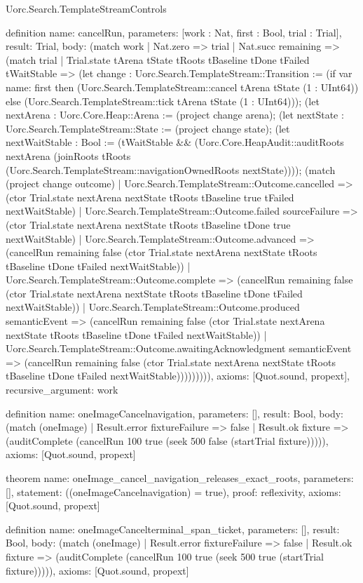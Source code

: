 \begin{lexlean}{Uorc.Search.TemplateStreamControls}
\begin{semanticmodule}
definition{
  name: cancelRun,
  parameters: [work : Nat, first : Bool, trial : Trial],
  result: Trial,
  body: (match work
    | Nat.zero => trial
    | Nat.succ remaining => (match trial
      | Trial.state tArena tState tRoots tBaseline tDone tFailed tWaitStable => (let change : Uorc.Search.TemplateStream::Transition := (if var{
        name: first
      } then (Uorc.Search.TemplateStream::cancel tArena tState (1 : UInt64)) else (Uorc.Search.TemplateStream::tick tArena tState (1 : UInt64))); (let nextArena : Uorc.Core.Heap::Arena := (project change arena); (let nextState : Uorc.Search.TemplateStream::State := (project change state); (let nextWaitStable : Bool := (tWaitStable && (Uorc.Core.HeapAudit::auditRoots nextArena (joinRoots tRoots (Uorc.Search.TemplateStream::navigationOwnedRoots nextState)))); (match (project change outcome)
        | Uorc.Search.TemplateStream::Outcome.cancelled => (ctor Trial.state nextArena nextState tRoots tBaseline true tFailed nextWaitStable)
        | Uorc.Search.TemplateStream::Outcome.failed sourceFailure => (ctor Trial.state nextArena nextState tRoots tBaseline tDone true nextWaitStable)
        | Uorc.Search.TemplateStream::Outcome.advanced => (cancelRun remaining false (ctor Trial.state nextArena nextState tRoots tBaseline tDone tFailed nextWaitStable))
        | Uorc.Search.TemplateStream::Outcome.complete => (cancelRun remaining false (ctor Trial.state nextArena nextState tRoots tBaseline tDone tFailed nextWaitStable))
        | Uorc.Search.TemplateStream::Outcome.produced semanticEvent => (cancelRun remaining false (ctor Trial.state nextArena nextState tRoots tBaseline tDone tFailed nextWaitStable))
        | Uorc.Search.TemplateStream::Outcome.awaitingAcknowledgment semanticEvent => (cancelRun remaining false (ctor Trial.state nextArena nextState tRoots tBaseline tDone tFailed nextWaitStable))))))))),
  axioms: [Quot.sound, propext],
  recursive_argument: work
}

definition{
  name: oneImageCancelnavigation,
  parameters: [],
  result: Bool,
  body: (match (oneImage)
    | Result.error fixtureFailure => false
    | Result.ok fixture => (auditComplete (cancelRun 100 true (seek 500 false (startTrial fixture))))),
  axioms: [Quot.sound, propext]
}

theorem{
  name: oneImage_cancel_navigation_releases_exact_roots,
  parameters: [],
  statement: ((oneImageCancelnavigation) = true),
  proof: reflexivity{},
  axioms: [Quot.sound, propext]
}

definition{
  name: oneImageCancelterminal_span_ticket,
  parameters: [],
  result: Bool,
  body: (match (oneImage)
    | Result.error fixtureFailure => false
    | Result.ok fixture => (auditComplete (cancelRun 100 true (seek 500 true (startTrial fixture))))),
  axioms: [Quot.sound, propext]
}


\end{semanticmodule}
\end{lexlean}
